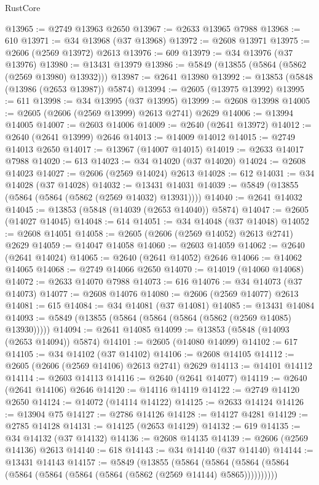 \begin{lexlean}{RustCore}
\begin{coremodule}
@13965 := @2749 @13963 @2650
@13967 := @2633 @13965 @7988
@13968 := 610
@13971 := @34 @13968 (@37 @13968)
@13972 := @2608 @13971
@13975 := @2606 (@2569 @13972) @2613
@13976 := 609
@13979 := @34 @13976 (@37 @13976)
@13980 := @13431 @13979
@13986 := @5849 (@13855 (@5864 (@5862 (@2569 @13980) @13932)))
@13987 := @2641 @13980
@13992 := @13853 (@5848 (@13986 (@2653 @13987)) @5874)
@13994 := @2605 (@13975 @13992)
@13995 := 611
@13998 := @34 @13995 (@37 @13995)
@13999 := @2608 @13998
@14005 := @2605 (@2606 (@2569 @13999) @2613 @2741) @2629
@14006 := @13994 @14005
@14007 := @2603 @14006
@14009 := @2640 (@2641 @13972)
@14012 := @2640 (@2641 @13999) @2646
@14013 := @14009 @14012
@14015 := @2749 @14013 @2650
@14017 := @13967 (@14007 @14015)
@14019 := @2633 @14017 @7988
@14020 := 613
@14023 := @34 @14020 (@37 @14020)
@14024 := @2608 @14023
@14027 := @2606 (@2569 @14024) @2613
@14028 := 612
@14031 := @34 @14028 (@37 @14028)
@14032 := @13431 @14031
@14039 := @5849 (@13855 (@5864 (@5864 (@5862 (@2569 @14032) @13931))))
@14040 := @2641 @14032
@14045 := @13853 (@5848 (@14039 (@2653 @14040)) @5874)
@14047 := @2605 (@14027 @14045)
@14048 := 614
@14051 := @34 @14048 (@37 @14048)
@14052 := @2608 @14051
@14058 := @2605 (@2606 (@2569 @14052) @2613 @2741) @2629
@14059 := @14047 @14058
@14060 := @2603 @14059
@14062 := @2640 (@2641 @14024)
@14065 := @2640 (@2641 @14052) @2646
@14066 := @14062 @14065
@14068 := @2749 @14066 @2650
@14070 := @14019 (@14060 @14068)
@14072 := @2633 @14070 @7988
@14073 := 616
@14076 := @34 @14073 (@37 @14073)
@14077 := @2608 @14076
@14080 := @2606 (@2569 @14077) @2613
@14081 := 615
@14084 := @34 @14081 (@37 @14081)
@14085 := @13431 @14084
@14093 := @5849 (@13855 (@5864 (@5864 (@5864 (@5862 (@2569 @14085) @13930)))))
@14094 := @2641 @14085
@14099 := @13853 (@5848 (@14093 (@2653 @14094)) @5874)
@14101 := @2605 (@14080 @14099)
@14102 := 617
@14105 := @34 @14102 (@37 @14102)
@14106 := @2608 @14105
@14112 := @2605 (@2606 (@2569 @14106) @2613 @2741) @2629
@14113 := @14101 @14112
@14114 := @2603 @14113
@14116 := @2640 (@2641 @14077)
@14119 := @2640 (@2641 @14106) @2646
@14120 := @14116 @14119
@14122 := @2749 @14120 @2650
@14124 := @14072 (@14114 @14122)
@14125 := @2633 @14124
@14126 := @13904 @75
@14127 := @2786 @14126
@14128 := @14127 @4281
@14129 := @2785 @14128
@14131 := @14125 (@2653 @14129)
@14132 := 619
@14135 := @34 @14132 (@37 @14132)
@14136 := @2608 @14135
@14139 := @2606 (@2569 @14136) @2613
@14140 := 618
@14143 := @34 @14140 (@37 @14140)
@14144 := @13431 @14143
@14157 := @5849
    (@13855
      (@5864 (@5864 (@5864 (@5864 (@5864 (@5864 (@5864 (@5864 (@5862 (@2569 @14144) @5865))))))))))

\end{coremodule}
\end{lexlean}
